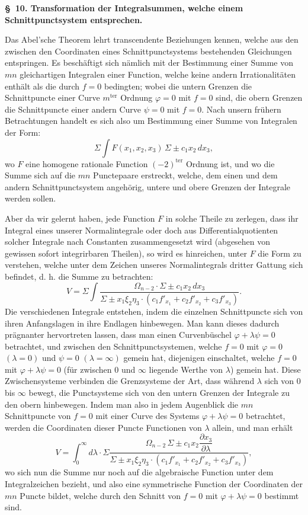 \documentclass[10pt]{article}
\begin{document}
\begin{center}
{\bfseries \S\ 10. Transformation der Integralsummen, welche einem Schnittpunctsystem entsprechen.}
\end{center}

Das Abel'sche Theorem lehrt transcendente Beziehungen kennen, welche aus den zwischen den Coordinaten eines Schnittpunctsystems bestehenden Gleichungen entspringen. Es beschäftigt sich nämlich mit der Bestimmung einer Summe von $mn$ gleichartigen Integralen einer Function, welche keine andern Irrationalitäten enthält als die durch $f=0$ bedingten; wobei die untern Grenzen die Schnittpuncte einer Curve $m^{\text{ter}}$ Ordnung $\varphi=0$ mit $f=0$ sind, die obern Grenzen die Schnittpuncte einer andern Curve $\psi=0$ mit $f=0$. Nach unsern frühern Betrachtungen handelt es sich also um Bestimmung einer Summe von Integralen der Form:
\[
\Sigma\int F(x_1,x_2,x_3)\,\Sigma\pm c_1x_2\,dx_3,
\]
wo $F$ eine homogene rationale Function $(-2)^{\text{ter}}$ Ordnung ist, und wo die Summe sich auf die $mn$ Punctepaare erstreckt, welche, dem einen und dem andern Schnittpunctsystem angehörig, untere und obere Grenzen der Integrale werden sollen.

Aber da wir gelernt haben, jede Function $F$ in solche Theile zu zerlegen, dass ihr Integral eines unserer Normalintegrale oder doch aus Differentialquotienten solcher Integrale nach Constanten zusammengesetzt wird (abgesehen von gewissen sofort integrirbaren Theilen), so wird es hinreichen, unter $F$ die Form zu verstehen, welche unter dem Zeichen unseres Normalintegrals dritter Gattung sich befindet, d. h. die Summe zu betrachten:
\[
V=\Sigma\int
\frac{\Omega_{n-2}\cdot \Sigma\pm c_1x_2\,dx_3}
{\Sigma\pm x_1\xi_2\eta_3\cdot(c_1 f'_{x_1}+c_2 f'_{x_2}+c_3 f'_{x_3})}.
\]
Die verschiedenen Integrale entstehen, indem die einzelnen Schnittpuncte sich von ihren Anfangslagen in ihre Endlagen hinbewegen. Man kann dieses dadurch prägnanter hervortreten lassen, dass man einen Curvenbüschel $\varphi+\lambda\psi=0$ betrachtet, und zwischen den Schnittpunctsystemen, welche $f=0$ mit $\varphi=0$ $(\lambda=0)$ und $\psi=0$ $(\lambda=\infty)$ gemein hat, diejenigen einschaltet, welche $f=0$ mit $\varphi+\lambda\psi=0$ (für zwischen $0$ und $\infty$ liegende Werthe von $\lambda$) gemein hat. Diese Zwischensysteme verbinden die Grenzsysteme der Art, dass während $\lambda$ sich von $0$ bis $\infty$ bewegt, die Punctsysteme sich von den untern Grenzen der Integrale zu den obern hinbewegen. Indem man also in jedem Augenblick die $mn$ Schnittpuncte von $f=0$ mit einer Curve des Systems $\varphi+\lambda\psi=0$ betrachtet, werden die Coordinaten dieser Puncte Functionen von $\lambda$ allein, und man erhält
\[
V=\int_0^\infty d\lambda\cdot \Sigma
\frac{\Omega_{n-2}\,\Sigma\pm c_1x_2\dfrac{\partial x_3}{\partial\lambda}}
{\Sigma\pm x_1\xi_2\eta_3\cdot(c_1 f'_{x_1}+c_2 f'_{x_2}+c_3 f'_{x_3})},
\]
wo sich nun die Summe nur noch auf die algebraische Function unter dem Integralzeichen bezieht, und also eine symmetrische Function der Coordinaten der $mn$ Puncte bildet, welche durch den Schnitt von $f=0$ mit $\varphi+\lambda\psi=0$ bestimmt sind.
\end{document}
